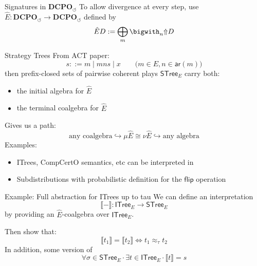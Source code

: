 \documentclass[aspectratio=1610,mathserif]{beamer}
\begin{document}
\begin{frame}{Signatures in $\mathbf{DCPO}_\circlearrowleft$}
  To allow divergence at every step, use
  $\hat{E} : \mathbf{DCPO}_\circlearrowleft \rightarrow
             \mathbf{DCPO}_\circlearrowleft$
  defined by
  \[
    \hat{E} D := \bigoplus_m \bigwith_n {\Uparrow} D
  \]
\end{frame}

\begin{frame}{Strategy Trees}
  From ACT paper:
  \[
    s ::= m \mid mns \mid x   \qquad
     \bigl( m \in E, n \in \mathsf{ar}(m) \bigr)
  \]
  then prefix-closed sets of pairwise coherent plays
  $\mathsf{STree}_E$
  carry both:
  \begin{itemize}
    \item the initial algebra for $\hat{E}$
    \item the terminal coalgebra for $\hat{E}$
  \end{itemize}

  \vspace{1em}
  Gives us a path:
  \[
    \text{any coalgebra} \hookrightarrow
    \mu \hat{E} \cong
    \nu \hat{E} \hookrightarrow
    \text{any algebra}
  \]
  Examples:
  \begin{itemize}
    \item ITrees, CompCertO semantics, etc can be interpreted in
    \item Subdistributions with probabilistic definition for the $\mathsf{flip}$
      operation
  \end{itemize}
\end{frame}

\begin{frame}{Example: Full abstraction for ITrees up to tau}
  We can define an interpretation
  \[
    \llbracket - \rrbracket :
       \mathsf{ITree}_E \rightarrow \mathsf{STree}_E
  \]
  by providing an $\hat{E}$-coalgebra
  over $\mathsf{ITree}_E$.

  \vspace{1em}
  Then show that:
  \[
    \llbracket t_1 \rrbracket = \llbracket t_2 \rrbracket
    \Longleftrightarrow
    t_1 \approx_\tau t_2
  \]
  In addition, some version of
  \[
    \forall \sigma \in \mathsf{STree}_E \cdot \exists
      t \in \mathsf{ITree}_E \cdot \llbracket t \rrbracket = s
  \]
\end{frame}
\end{document}
